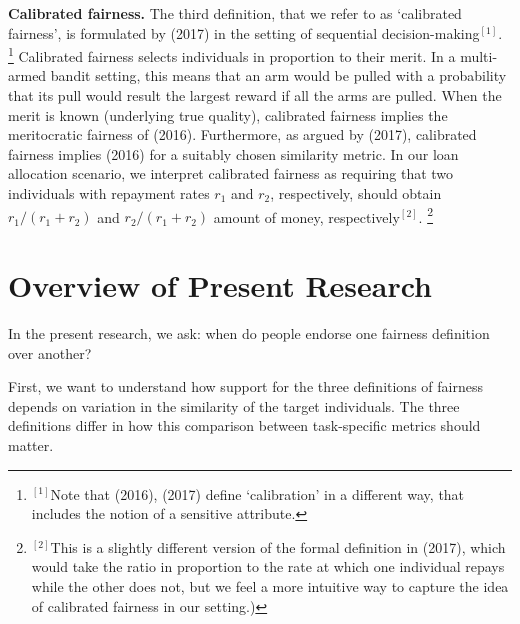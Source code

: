 \documentclass[letterpaper]{article} %
\begin{document}
\noindent
\textbf{Calibrated fairness.}
The third definition, that we refer to as `calibrated fairness', is formulated by \citeauthor{liu2017calibrated} (2017) in the setting of sequential decision-making$^{[1]}$. \footnote{$^{[1]}$Note that \citeauthor{kleinberg2016inherent} (2016), \citeauthor{chouldechova2017fair} (2017) define `calibration' in a different way, that includes the notion of a sensitive attribute.} Calibrated fairness selects individuals in proportion to their merit. In a multi-armed bandit setting, this means that an arm would be pulled with a probability that its pull would result the largest reward if all the arms are pulled. When the merit is known (underlying true quality), calibrated fairness implies the meritocratic fairness of  \citeauthor{joseph2016fairness} (2016). Furthermore, as argued by \citeauthor{liu2017calibrated} (2017), calibrated fairness implies \citeauthor{dwork2012fairness} (2016) for a suitably chosen similarity metric. In our loan allocation scenario, we interpret calibrated fairness as requiring that two individuals with repayment rates $r_1$ and $r_2$, respectively, should  obtain $r_1/(r_1 + r_2)$ and $r_2/(r_1 + r_2)$ amount of money, respectively$^{[2]}$. \footnote{$^{[2]}$This is a slightly different version of the formal definition in \citeauthor{liu2017calibrated} (2017), which would take the ratio in proportion to the rate at which one individual repays while the other does not, but we feel a more intuitive way to capture the idea of  calibrated fairness in our setting.)}




\section{Overview of Present Research}
In the present research, we ask: when do people endorse one fairness definition over another?

First, we want to understand how support for the three definitions of fairness depends on variation in the similarity of the target individuals.  The three definitions differ in how this comparison between task-specific metrics should matter. 
%
\end{document}
